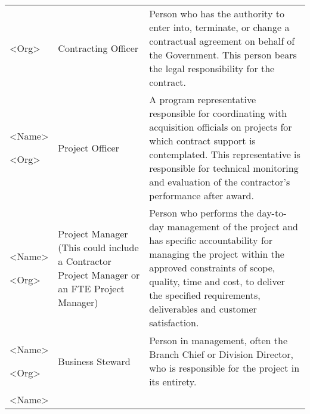 \begin{longtable}[]{@{}lll@{}}
\begin{minipage}[t]{0.30\columnwidth}
\textless{}Org\textgreater{}\strut
\end{minipage} & \begin{minipage}[t]{0.30\columnwidth}\raggedright
Contracting Officer\strut
\end{minipage} & \begin{minipage}[t]{0.30\columnwidth}\raggedright
Person who has the authority to enter into, terminate, or change a
contractual agreement on behalf of the Government. This person bears the
legal responsibility for the contract.\strut
\end{minipage}\tabularnewline
\begin{minipage}[t]{0.30\columnwidth}\raggedright
\textless{}Name\textgreater{}

\textless{}Org\textgreater{}\strut
\end{minipage} & \begin{minipage}[t]{0.30\columnwidth}\raggedright
Project Officer\strut
\end{minipage} & \begin{minipage}[t]{0.30\columnwidth}\raggedright
A program representative responsible for coordinating with acquisition
officials on projects for which contract support is contemplated. This
representative is responsible for technical monitoring and evaluation of
the contractor's performance after award.\strut
\end{minipage}\tabularnewline
\begin{minipage}[t]{0.30\columnwidth}\raggedright
\textless{}Name\textgreater{}

\textless{}Org\textgreater{}\strut
\end{minipage} & \begin{minipage}[t]{0.30\columnwidth}\raggedright
Project Manager (This could include a Contractor Project Manager or an
FTE Project Manager)\strut
\end{minipage} & \begin{minipage}[t]{0.30\columnwidth}\raggedright
Person who performs the day-to-day management of the project and has
specific accountability for managing the project within the approved
constraints of scope, quality, time and cost, to deliver the specified
requirements, deliverables and customer satisfaction.\strut
\end{minipage}\tabularnewline
\begin{minipage}[t]{0.30\columnwidth}\raggedright
\textless{}Name\textgreater{}

\textless{}Org\textgreater{}\strut
\end{minipage} & \begin{minipage}[t]{0.30\columnwidth}\raggedright
Business Steward\strut
\end{minipage} & \begin{minipage}[t]{0.30\columnwidth}\raggedright
Person in management, often the Branch Chief or Division Director, who
is responsible for the project in its entirety.\strut
\end{minipage}\tabularnewline
\begin{minipage}[t]{0.30\columnwidth}\raggedright
\textless{}Name\textgreater{}


\end{minipage}
\end{longtable}
